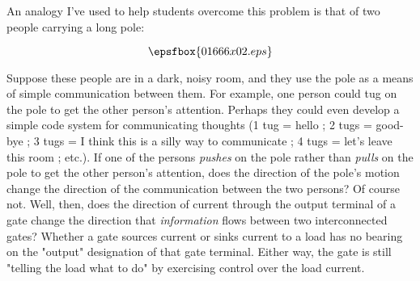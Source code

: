 An analogy I've used to help students overcome this problem is that of two people carrying a long pole:

$$\epsfbox{01666x02.eps}$$

Suppose these people are in a dark, noisy room, and they use the pole as a means of simple communication between them.  For example, one person could tug on the pole to get the other person's attention.  Perhaps they could even develop a simple code system for communicating thoughts (1 tug = hello ; 2 tugs = good-bye ; 3 tugs = I think this is a silly way to communicate ; 4 tugs = let's leave this room ; etc.).  If one of the persons {\it pushes} on the pole rather than {\it pulls} on the pole to get the other person's attention, does the direction of the pole's motion change the direction of the communication between the two persons?  Of course not.  Well, then, does the direction of current through the output terminal of a gate change the direction that {\it information} flows between two interconnected gates?  Whether a gate sources current or sinks current to a load has no bearing on the "output" designation of that gate terminal.  Either way, the gate is still "telling the load what to do" by exercising control over the load current.




